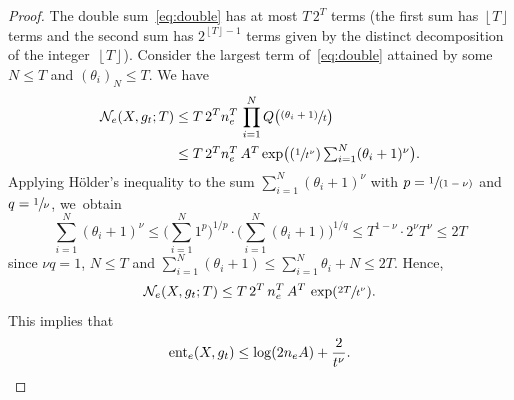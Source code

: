 \documentclass[11pt]{article}
\let\oldsfrac\sfrac
\renewcommand{\sfrac}[2]{{\oldsfrac{#1}{#2}}}
\newcommand{\Psfrac}[2]{(\sfrac{#1}{#2})}
\newcommand{\psfrac}[2]{\sfrac{(#1)}{#2}}
\newcommand{\spfrac}[2]{\sfrac{#1}{(#2)}}
\theoremstyle{definition}
\numberwithin{equation}{section}
\begin{document}
\begin{proof}
The double sum~\eqref{eq:double} has at most $T \, 2^T$ terms (the first sum has $\left \lfloor{T}\right \rfloor$ terms and the second sum has $2^{\left \lfloor{T}\right \rfloor-1}$ terms given by the distinct decomposition of the integer~$\left \lfloor{T}\right \rfloor$).
Consider the largest term of~\eqref{eq:double} attained by some $N \leq T$ and $(\theta_i)_N \leq T$.
We have
\begin{equation}\label{eq:max}
\begin{aligned}
\mathcal{N}_e(X,g_t;T) & \leq T \, 2^T n_e^T \, \prod_{i=1}^N Q \bigl(\psfrac{\theta_i +1}{t} \bigr) \\
&\textstyle \leq T \, 2^T n_e^T \, A^T \exp \bigl(\Psfrac{1}{t^\nu} \sum_{i=1}^N (\theta_i +1)^\nu \bigr).
\end{aligned}
\end{equation}
Applying Hölder's inequality to the sum $\sum_{i=1}^N (\theta_i +1)^\nu$ with $p=\spfrac{1}{1-\nu}$ and $q=\sfrac{1}{\nu}$, we~obtain
\[
\sum_{i=1}^N (\theta_i +1)^\nu \leq \biggl(\sum_{i=1}^N 1^p \biggr)^{1/p} \cdot \biggl(\sum_{i=1}^N (\theta_i +1) \biggr)^{1/q} \leq T^{1-\nu} \cdot 2^\nu T^\nu \leq 2T
\]
since $\nu q =1$, $N \leq T$ and $\sum_{i=1}^N (\theta_i +1) \leq \sum_{i=1}^N \theta_i +N \leq 2T$.
Hence,
\[
\mathcal{N}_e(X,g_t;T) \leq T \, 2^T \, n_e^T \, A^T \, \exp(\sfrac{2T}{t^\nu}).
\]
This implies that
\[
\operatorname{ent}_e(X,g_t) \leq \log(2n_eA) + \frac{2}{t^\nu}.\qedhere
\]
\end{proof}
\end{document}
